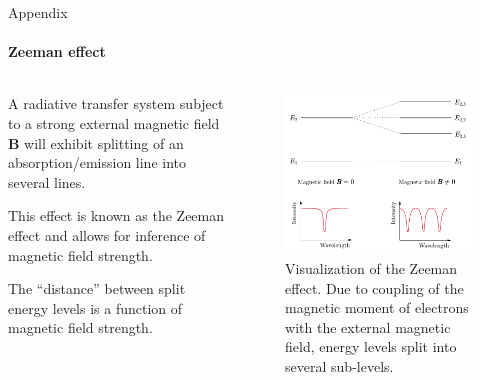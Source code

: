 \documentclass{beamer}
\newcommand\vect[1]{\ensuremath{\bm{#1}}}
\begin{document}
\begin{frame}[allowframebreaks]{Appendix}
	\framesubtitle{Zeeman effect}
	\begin{columns}
		\begin{column}{0.49\textwidth}
			A radiative transfer system subject to a strong external magnetic field $\vect{B}$ will exhibit splitting of an absorption/emission line into several lines.
			
			This effect is known as the Zeeman effect and allows for inference of magnetic field strength.
			
			The ``distance'' between split energy levels is a function of magnetic field strength.
		\end{column}
		\begin{column}{0.49\textwidth}
			\begin{figure}[h]
				\centering
				\includegraphics[width=\textwidth]{figures/thesis/zeemaneffect.pdf}
				\caption{Visualization of the Zeeman effect. Due to coupling of the magnetic moment of electrons with the external magnetic field, energy levels split into several sub-levels.}
				\label{fig:zeemaneffect}
			\end{figure}
		\end{column}
	\end{columns}
\end{frame}
\end{document}

